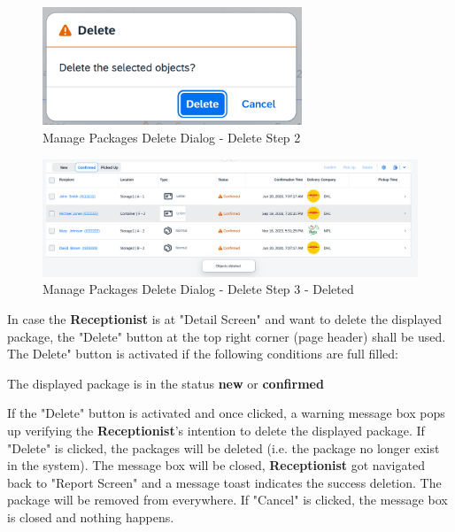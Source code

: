 \begin{figure}[H]
	\centering
	\includegraphics[height=100pt]{images/user_doc/managePack/ReportScreen/delete/deleteDlalog.png}
	\caption{Manage Packages Delete Dialog - Delete Step 2}
	\label{fig:MPReportDeleteDlg}
\end{figure}

\begin{figure}[H]
	\centering
	\includegraphics[height=100pt]{images/user_doc/managePack/ReportScreen/delete/deleteToast.png}
	\caption{Manage Packages Delete Dialog - Delete Step 3 - Deleted}
	\label{fig:MPReportDeleteDone}
\end{figure}


\bigskip
In case the \textbf{Receptionist} is at "Detail Screen" and want to delete the displayed package, the "Delete" button at the top right corner (page header) shall be used. 
The Delete" button is activated if the following conditions are full filled:

\begin{compactenum}
    \item The displayed package is in the status \textbf{new} or \textbf{confirmed}
\end{compactenum}

\bigskip
If the "Delete" button is activated and once clicked, a warning message box pops up verifying the \textbf{Receptionist}'s intention to delete the displayed package. If "Delete" is clicked, the packages will be deleted (i.e. the package no longer exist in the system). The message box will be closed, \textbf{Receptionist} got navigated back to "Report Screen" and a message toast indicates the success deletion. The package will be removed from everywhere. If "Cancel" is clicked, the message box is closed and nothing happens.


